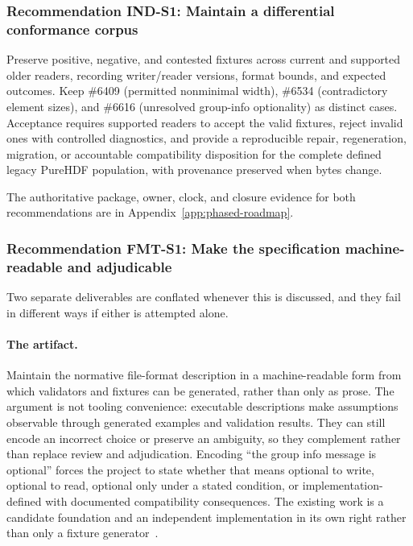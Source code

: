 \documentclass[../main.tex]{subfiles}
\begin{document}
\subsubsection*{Recommendation IND-S1: Maintain a differential conformance corpus}

Preserve positive, negative, and contested fixtures across current and
supported older readers, recording writer/reader versions, format bounds, and
expected outcomes. Keep \#6409 (permitted nonminimal width), \#6534
(contradictory element sizes), and \#6616 (unresolved group-info optionality)
as distinct cases. Acceptance requires supported readers to accept the valid
fixtures, reject invalid ones with controlled diagnostics, and provide a
reproducible repair, regeneration, migration, or accountable compatibility
disposition for the complete defined legacy PureHDF population, with provenance
preserved when bytes change.

The authoritative package, owner, clock, and closure evidence for both
recommendations are in Appendix~\ref{app:phased-roadmap}.

\iffalse
\subsubsection*{Recommendation FMT-S1: Make the specification machine-readable and adjudicable}

Two separate deliverables are conflated whenever this is discussed, and they
fail in different ways if either is attempted alone.

\paragraph{The artifact.}
Maintain the normative file-format description in a machine-readable form from
which validators and fixtures can be generated, rather than only as prose. The
argument is not tooling convenience: executable descriptions make assumptions
observable through generated examples and validation results. They can still
encode an incorrect choice or preserve an ambiguity, so they complement rather
than replace review and adjudication. Encoding ``the group info message is
optional'' forces the project to state whether that means optional to write,
optional to read, optional only under a stated condition, or
implementation-defined with documented compatibility consequences. The
existing  work is a candidate foundation and an independent
implementation in its own right rather than only a fixture
generator~\cite{h5lens}.
\end{document}
